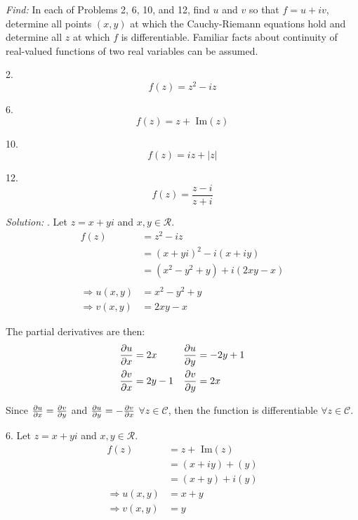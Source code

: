 \documentclass[11pt]{homework}
\begin{document}
\maketitle

\emph{Find:}
\newline
In each of Problems 2, 6, 10, and 12, 
find $u$ and $v$ so that 
$f=u+iv$, determine all points $(x,y)$
at which the Cauchy-Riemann 
equations hold and determine all 
$z$ at which $f$ is differentiable.
Familiar facts about continuity of 
real-valued functions of two real variables
can be assumed. 

2. 
\begin{equation*}
  f(z) = z^2 - iz
\end{equation*}

6. 
\begin{equation*}
  f(z) = z + \text{ Im}(z)
\end{equation*}

10.
\begin{equation*}
  f(z) = iz + |z|
\end{equation*}

12.
\begin{equation*}
  f(z) = \frac{z-i}{z+i}
\end{equation*}

\emph{Solution:}
.
Let $z = x+yi$ and $x,y \in \mathcal{R}$.
\begin{align*}
  f(z) &= z^2 - iz \\
       &= (x+yi)^2 - i(x+iy) \\
       &= (x^2 - y^2 +y) + i ( 2xy - x) \\
      \\
\Rightarrow
  u(x,y) &=x^2 - y^2 +y  \\
\Rightarrow
  v(x,y) &=2xy - x 
\end{align*}

The partial derivatives are then:
\begin{align*}
  \pdv{u}{x} &= 2x    & \pdv{u}{y} &= -2y +1 \\
  \pdv{v}{x} &= 2y-1  & \pdv{v}{y} &= 2x
\end{align*}

Since $\pdv{u}{x}=\pdv{v}{y}$ and $\pdv{u}{y}=-\pdv{v}{x}$ 
$\forall z \in \mathcal{C}$,
then the function is differentiable $ \forall z \in \mathcal{C}$.

6. 
Let $z = x+yi$ and $x,y \in \mathcal{R}$.
\begin{align*}
  f(z) &= z + \text{ Im}(z) \\
   &= (x+iy) + (y) \\
   &= (x+y) + i(y)
      \\
\Rightarrow
  u(x,y) &= x+y \\
\Rightarrow
  v(x,y) &=y
\end{align*}
\end{document}
